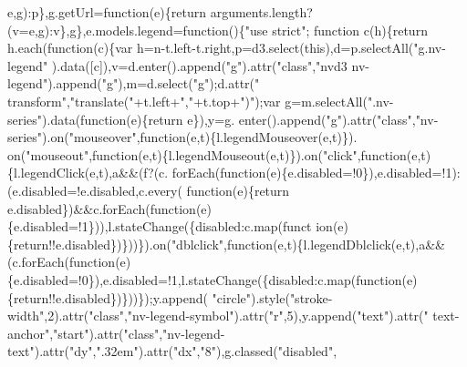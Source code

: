 \begin{DoxyCode}
{{      e,g):p\},g.getUrl=\textcolor{keyword}{function}(e)\{\textcolor{keywordflow}{return} arguments.length?(v=e,g):v\},g\},e.models.legend=\textcolor{keyword}{function}()\{\textcolor{stringliteral}{"use strict"};\textcolor{keyword}{
      function} c(h)\{\textcolor{keywordflow}{return} h.each(\textcolor{keyword}{function}(c)\{var h=n-t.left-t.right,p=d3.select(\textcolor{keyword}{this}),d=p.selectAll(\textcolor{stringliteral}{"g.nv-legend"}
      ).data([c]),v=d.enter().append(\textcolor{stringliteral}{"g"}).attr(\textcolor{stringliteral}{"class"},\textcolor{stringliteral}{"nvd3 nv-legend"}).append(\textcolor{stringliteral}{"g"}),m=d.select(\textcolor{stringliteral}{"g"});d.attr(\textcolor{stringliteral}{"
      transform"},\textcolor{stringliteral}{"translate("}+t.left+\textcolor{stringliteral}{","}+t.top+\textcolor{stringliteral}{")"});var g=m.selectAll(\textcolor{stringliteral}{".nv-series"}).data(\textcolor{keyword}{function}(e)\{\textcolor{keywordflow}{return} e\}),y=g.
      enter().append(\textcolor{stringliteral}{"g"}).attr(\textcolor{stringliteral}{"class"},\textcolor{stringliteral}{"nv-series"}).on(\textcolor{stringliteral}{"mouseover"},\textcolor{keyword}{function}(e,t)\{l.legendMouseover(e,t)\}).
      on(\textcolor{stringliteral}{"mouseout"},\textcolor{keyword}{function}(e,t)\{l.legendMouseout(e,t)\}).on(\textcolor{stringliteral}{"click"},\textcolor{keyword}{function}(e,t)\{l.legendClick(e,t),a&&(f?(c.
      forEach(\textcolor{keyword}{function}(e)\{e.disabled=!0\}),e.disabled=!1):(e.disabled=!e.disabled,c.every(
      function(e)\{\textcolor{keywordflow}{return} e.disabled\})&&c.forEach(\textcolor{keyword}{function}(e)\{e.disabled=!1\})),l.stateChange(\{disabled:c.map(funct
      ion(e)\{return!!e.disabled\})\}))\}).on(\textcolor{stringliteral}{"dblclick"},\textcolor{keyword}{function}(e,t)\{l.legendDblclick(e,t),a&&(c.forEach(\textcolor{keyword}{function}(e)
      \{e.disabled=!0\}),e.disabled=!1,l.stateChange(\{disabled:c.map(function(e)\{return!!e.disabled\})\}))\});y.append(\textcolor{stringliteral}{
      "circle"}).style(\textcolor{stringliteral}{"stroke-width"},2).attr(\textcolor{stringliteral}{"class"},\textcolor{stringliteral}{"nv-legend-symbol"}).attr(\textcolor{stringliteral}{"r"},5),y.append(\textcolor{stringliteral}{"text"}).attr(\textcolor{stringliteral}{"
      text-anchor"},\textcolor{stringliteral}{"start"}).attr(\textcolor{stringliteral}{"class"},\textcolor{stringliteral}{"nv-legend-text"}).attr(\textcolor{stringliteral}{"dy"},\textcolor{stringliteral}{".32em"}).attr(\textcolor{stringliteral}{"dx"},\textcolor{stringliteral}{"8"}),g.classed(\textcolor{stringliteral}{"disabled"},\textcolor{keyword}{
}}}
\end{DoxyCode}
